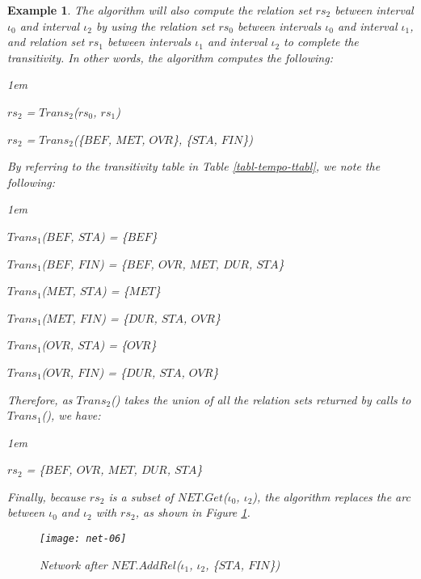 \documentclass[11pt]{report}
\newtheorem{vexample}{Example}[chapter]
\newenvironment{vquote}
{
  \begin{list}{}{\leftmargin 1em}\item[]
}
{
  \end{list}
}
\begin{document}
\begin{vexample}
            \noindent
            The algorithm will also compute the relation set $rs_2$ between
            interval $\iota_0$ and interval $\iota_2$ by using the relation set
            $rs_0$ between intervals $\iota_0$ and interval $\iota_1$, and
            relation set $rs_1$ between intervals $\iota_1$ and interval
            $\iota_2$ to complete the transitivity. In other words, the
            algorithm computes the following:

            \begin{vquote}
              $rs_2$ = $Trans_2$($rs_0$, $rs_1$)

              $rs_2$ = $Trans_2$(\{$BEF$, $MET$, $OVR$\}, \{$STA$, $FIN$\})
            \end{vquote}

            \noindent
            By referring to the transitivity table in Table
            \ref{tabl-tempo-ttabl}, we note the following:

            \begin{vquote}
              $Trans_1$($BEF$, $STA$) = \{$BEF$\}

              $Trans_1$($BEF$, $FIN$) = \{$BEF$, $OVR$, $MET$, $DUR$, $STA$\}

              $Trans_1$($MET$, $STA$) = \{$MET$\}

              $Trans_1$($MET$, $FIN$) = \{$DUR$, $STA$, $OVR$\}

              $Trans_1$($OVR$, $STA$) = \{$OVR$\}

              $Trans_1$($OVR$, $FIN$) = \{$DUR$, $STA$, $OVR$\}
            \end{vquote}

            \noindent
            Therefore, as $Trans_2$() takes the union of all the relation sets
            returned by calls to $Trans_1$(), we have:

            \begin{vquote}
              $rs_2$ = \{$BEF$, $OVR$, $MET$, $DUR$, $STA$\}
            \end{vquote}

            \noindent
            Finally, because $rs_2$ is a subset of $NET.Get$($\iota_0$,
            $\iota_2$), the algorithm replaces the arc between $\iota_0$ and
            $\iota_2$ with $rs_2$, as shown in Figure \ref{figu-tempo-ntwk6}.

            \begin{figure}[tbhp]
              \begin{center}
                \texttt{[image: net-06]}
                \caption{Network after $NET.AddRel$($\iota_1$, $\iota_2$, \{$STA$, $FIN$\})}
                \label{figu-tempo-ntwk6}
              \end{center}
            \end{figure}
          \end{vexample}
\end{document}
